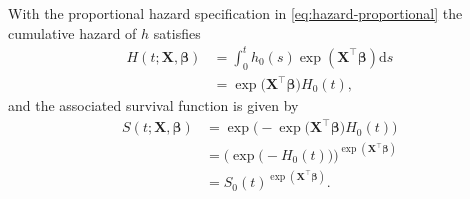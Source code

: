 \documentclass[11pt]{article}
\newcommand{\X}{\mathbf{X}}
\renewcommand{\b}{\bm{\beta}}
\renewcommand{\d}{\text{d}}
\begin{document}
With the proportional hazard specification in \eqref{eq:hazard-proportional} the cumulative hazard of $h$ satisfies
\begin{equation*}
\begin{split}
    H(t ; \X, \b) &= \int^t_0 h_0(s) \exp \left(\X^\top \b \right) \d s
    \\
    &= \exp \big(\X^\top \b \big) H_0(t),
\end{split}
\end{equation*}
and the associated survival function is given by
\begin{equation} \label{eq:cox-survival}
\begin{split}
    S(t ; \X, \b) 
    &=
    \exp\Big( - \exp\big( \X^\top \b \big) H_0(t)  \Big)
    \\&=
    \Big(\exp\big( - H_0(t) \big) \Big)^{\exp(\X^\top \b)}
    \\&=
    S_0(t)^{\exp(\X^\top \b)}.
\end{split}
\end{equation}
\end{document}
